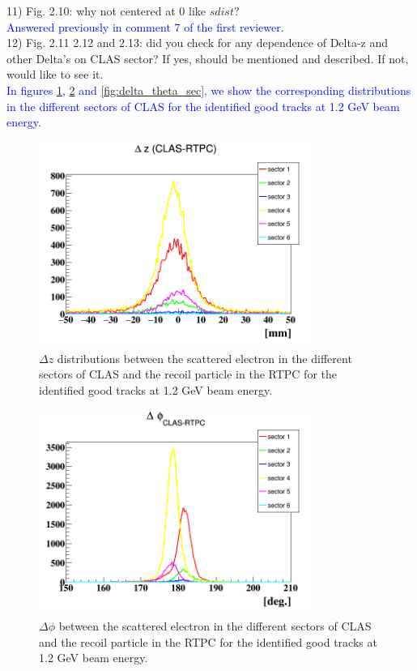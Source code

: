 11) Fig. 2.10: why not centered at 0 like $sdist$?\\
\textcolor{blue}{ Answered previously in comment 7 of the first reviewer.}\\


12) Fig. 2.11 2.12 and 2.13: did you check for any dependence of Delta-z and other 
Delta's on CLAS sector? If yes, should be mentioned and described. If not, 
would like to see it.\\
\textcolor{blue}{In figures \ref{fig:delta_z_sec}, \ref{fig:delta_phi_sec} and 
\ref{fig:delta_theta_sec}, we show the corresponding distributions in the 
different sectors of CLAS for the identified good tracks at 1.2 GeV beam 
energy.}\\

\begin{figure}[tbp]
\centering
\includegraphics[height=6.7cm]{fig/delta_z_sec.png}
\caption{$\Delta z$ distributions between the scattered electron in the 
different sectors of CLAS and the recoil particle in the RTPC for the 
identified good tracks at 1.2 GeV beam energy.}
\label{fig:delta_z_sec}
 \end{figure}


\begin{figure}[tbp]
\centering
\includegraphics[height=6.7cm]{fig/delta_phi_sec.png}
\caption{ $\Delta \phi$ between the scattered electron in the different sectors 
of CLAS and the recoil particle in the RTPC for the identified good tracks at 
1.2 GeV beam energy.}
\label{fig:delta_phi_sec}
 \end{figure}


